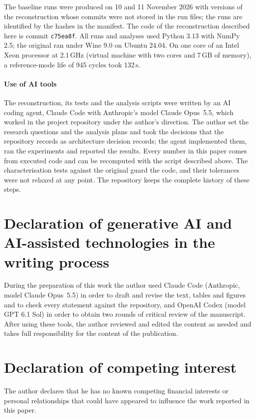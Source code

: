 \documentclass[preprint,12pt,authoryear]{elsarticle}
\newcommand{\code}[1]{\texttt{#1}}
\begin{document}
The baseline runs were produced on 10 and 11 November 2026 with versions of the reconstruction whose commits were not stored in the run files; the runs are identified by the hashes in the manifest. The code of the reconstruction described here is commit \code{c75ea8f}. All runs and analyses used Python 3.13 with NumPy 2.5; the original ran under Wine 9.0 on Ubuntu 24.04. On one core of an Intel Xeon processor at 2.1\,GHz (virtual machine with two cores and 7\,GB of memory), a reference-mode life of 945 cycles took 132\,s.

\paragraph{Use of AI tools} The reconstruction, its tests and the analysis scripts were written by an AI coding agent, Claude Code with Anthropic's model Claude Opus~5.5, which worked in the project repository under the author's direction. The author set the research questions and the analysis plans and took the decisions that the repository records as architecture decision records; the agent implemented them, ran the experiments and reported the results. Every number in this paper comes from executed code and can be recomputed with the script described above. The characterisation tests against the original guard the code, and their tolerances were not relaxed at any point. The repository keeps the complete history of these steps.

\section*{Declaration of generative AI and AI-assisted technologies in the writing process}

During the preparation of this work the author used Claude Code (Anthropic, model Claude Opus~5.5) in order to draft and revise the text, tables and figures and to check every statement against the repository, and OpenAI Codex (model GPT 6.1 Sol) in order to obtain two rounds of critical review of the manuscript. After using these tools, the author reviewed and edited the content as needed and takes full responsibility for the content of the publication.

\section*{Declaration of competing interest}

The author declares that he has no known competing financial interests or personal relationships that could have appeared to influence the work reported in this paper.
\end{document}
